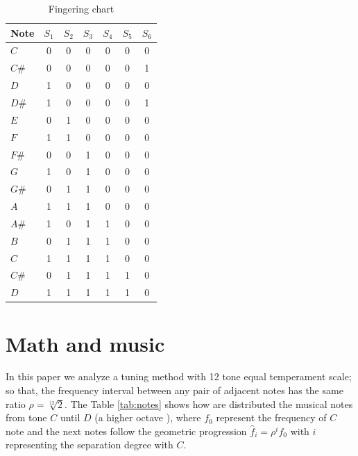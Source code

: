 \documentclass[11pt,twocolumn]{article}
\begin{document}
\begin{table}[h!]
\center
\begin{tabular}{l|c|c|c|c|c|c}
Note & $S_1$ & $S_2$ & $S_3$ & $S_4$ & $S_5$ & $S_6$ \\ \hline
\hline 
$C$  & 0 & 0 & 0 & 0 & 0 & 0 \\
$C\#$& 0 & 0 & 0 & 0 & 0 & 1 \\
$D$  & 1 & 0 & 0 & 0 & 0 & 0 \\
$D\#$& 1 & 0 & 0 & 0 & 0 & 1 \\
$E$  & 0 & 1 & 0 & 0 & 0 & 0 \\
$F$  & 1 & 1 & 0 & 0 & 0 & 0 \\
$F\#$& 0 & 0 & 1 & 0 & 0 & 0 \\
$G$  & 1 & 0 & 1 & 0 & 0 & 0 \\
$G\#$& 0 & 1 & 1 & 0 & 0 & 0 \\
$A$  & 1 & 1 & 1 & 0 & 0 & 0 \\
$A\#$& 1 & 0 & 1 & 1 & 0 & 0 \\
$B$  & 0 & 1 & 1 & 1 & 0 & 0 \\
$C$& 1 & 1 & 1 & 1 & 0 & 0 \\
$C\#$& 0 & 1 & 1 & 1 & 1 & 0 \\
$D$& 1 & 1 & 1 & 1 & 1 & 0 \\
\hline
\end{tabular}
\vspace{5pt}
\caption{Fingering chart}
\label{table:chart}
\end{table}

\section{Math and music}
In this paper we analyze a tuning method with 12 tone equal temperament scale; so that, the frequency interval
between any pair of adjacent notes has the same ratio $\rho = {\sqrt[12]{2}}$.
The Table \ref{tab:notes} shows how are distributed the musical notes from tone $C$ until $D$ (a higher octave ),
where $f_0$ represent the frequency of $C$ note and the next notes
follow the geometric progression $\hat{f}_{i}={\rho}^i f_{0}$ with $i$ representing the separation degree with $C$. 
\end{document}
